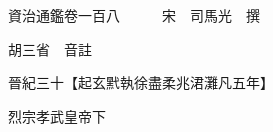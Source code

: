 










 


 
 


 

  
  
  
  
  





  
  
  
  
  
 
  

  

  
  
  



  

 
 

  
   




  

  
  


  　　資治通鑑卷一百八　　　宋　司馬光　撰

　　胡三省　音註

　　晉紀三十【起玄黓執徐盡柔兆涒灘凡五年】

　　烈宗孝武皇帝下

